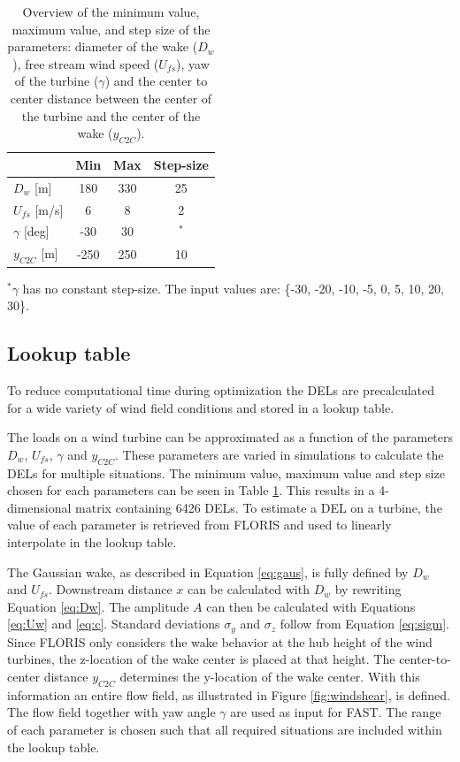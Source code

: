 \begin{table}[h]
	\caption{Overview of the minimum value, maximum value, and step size of the parameters: diameter of the wake ($D_w$), free stream wind speed ($U_{fs}$), yaw of the turbine ($\gamma$) and the center to center distance between the center of the turbine and the center of the wake ($y_{C2C}$).}
	\centering
	\label{tab:pars}
	\begin{tabular}{lccc}
		\hline
	 	& Min & Max & Step-size \\ 
		\hline
		$D_w$ [m] & 180 & 330 & 25 \\
		$U_{fs}$ [m/s] & 6 & 8 & 2 \\
		$\gamma$ [deg] & -30 & 30 & $^*$ \\
		$y_{C2C}$ [m] & -250 & 250 & 10 \\
		\hline
	\end{tabular}

$^* \gamma$ has no constant step-size. The input values are: \{-30, -20, -10, -5, 0, 5, 10, 20, 30\}.
\end{table}

\subsection{Lookup table} \label{sec:lut}
To reduce computational time during optimization the DELs are precalculated for a wide variety of wind field conditions and stored in a lookup table.

The loads on a wind turbine can be approximated as a function of the parameters $D_w$, $U_{fs}$, $\gamma$ and $y_{C2C}$. These parameters are varied in simulations to calculate the DELs for multiple situations. The minimum value, maximum value and step size chosen for each parameters can be seen in Table \ref{tab:pars}. This results in a 4-dimensional matrix containing 6426 DELs. To estimate a DEL on a turbine, the value of each parameter is retrieved from FLORIS and used to linearly interpolate in the lookup table.

The Gaussian wake, as described in Equation \ref{eq:gaus}, is fully defined by $D_w$ and $U_{fs}$. Downstream distance $x$ can be calculated with $D_w$ by rewriting Equation \ref{eq:Dw}. The amplitude $A$ can then be calculated with Equations \ref{eq:Uw} and \ref{eq:c}. Standard deviations $\sigma_y$ and $\sigma_z$ follow from Equation \ref{eq:sigm}. Since FLORIS only considers the wake behavior at the hub height of the wind turbines, the z-location of the wake center is placed at that height. The center-to-center distance $y_{C2C}$ determines the y-location of the wake center. With this information an entire flow field, as illustrated in Figure \ref{fig:windshear}, is defined. The flow field together with yaw angle $\gamma$ are used as input for FAST. The range of each parameter is chosen such that all required situations are included within the lookup table.

